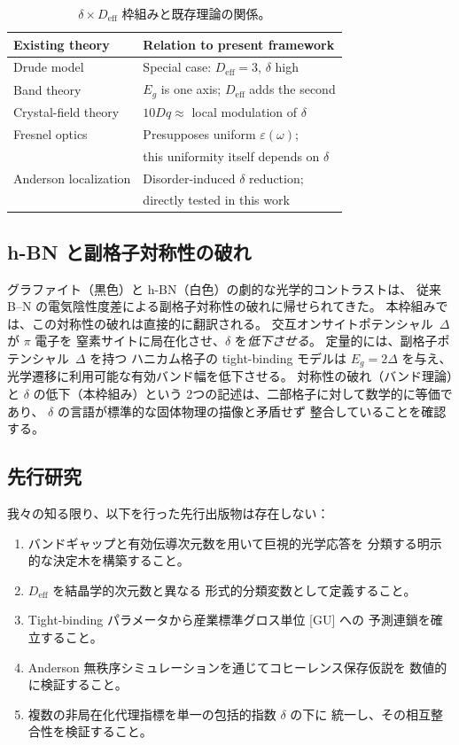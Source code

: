 \documentclass[twocolumn,showpacs,preprintnumbers,amsmath,amssymb,prb]{revtex4-2}
\begin{document}
\begin{table}[h]
\caption{$\delta \times D_\mathrm{eff}$ 枠組みと既存理論の関係。}
\label{tab:existing}
\begin{ruledtabular}
\begin{tabular}{ll}
  Existing theory & Relation to present framework \\
  \hline
  Drude model & Special case: $D_\mathrm{eff} = 3$, $\delta$ high \\
  Band theory & $E_g$ is one axis; $D_\mathrm{eff}$ adds the second \\
  Crystal-field theory & $10Dq \approx$ local modulation of $\delta$ \\
  Fresnel optics & Presupposes uniform $\varepsilon(\omega)$; \\
   & this uniformity itself depends on $\delta$ \\
  Anderson localization & Disorder-induced $\delta$ reduction; \\
   & directly tested in this work \\
\end{tabular}
\end{ruledtabular}
\end{table}

\subsection{h-BN と副格子対称性の破れ}
\label{sec:hBN_discussion}

グラファイト（黒色）と h-BN（白色）の劇的な光学的コントラストは、
従来 B--N の電気陰性度差による副格子対称性の破れに帰せられてきた。
本枠組みでは、この対称性の破れは直接的に翻訳される。
交互オンサイトポテンシャル~$\Delta$ が $\pi$ 電子を
窒素サイトに局在化させ、$\delta$ を\emph{低下させる}。
定量的には、副格子ポテンシャル~$\Delta$ を持つ
ハニカム格子の tight-binding モデルは $E_g = 2\Delta$ を与え、
光学遷移に利用可能な有効バンド幅を低下させる。
対称性の破れ（バンド理論）と $\delta$ の低下（本枠組み）という
2つの記述は、二部格子に対して数学的に等価であり、
$\delta$ の言語が標準的な固体物理の描像と矛盾せず
整合していることを確認する。

\subsection{先行研究}

我々の知る限り、以下を行った先行出版物は存在しない：
\begin{enumerate}
  \item バンドギャップと有効伝導次元数を用いて巨視的光学応答を
    分類する明示的な決定木を構築すること。
  \item $D_\mathrm{eff}$ を結晶学的次元数と異なる
    形式的分類変数として定義すること。
  \item Tight-binding パラメータから産業標準グロス単位 [GU] への
    予測連鎖を確立すること。
  \item Anderson 無秩序シミュレーションを通じてコヒーレンス保存仮説を
    数値的に検証すること。
  \item 複数の非局在化代理指標を単一の包括的指数 $\delta$ の下に
    統一し、その相互整合性を検証すること。
\end{enumerate}
\end{document}
